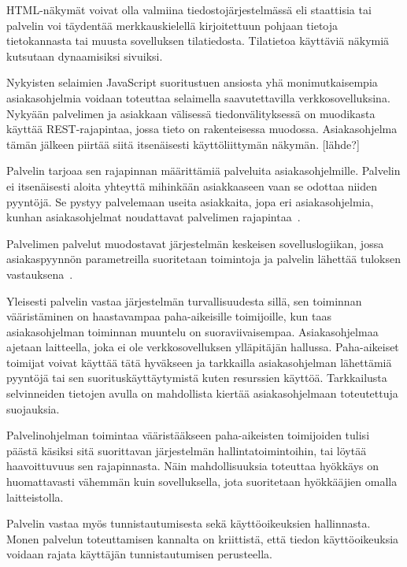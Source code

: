 \documentclass[finnish]{tktltiki2}
\theoremstyle{definition}
\theoremstyle{remark}
\begin{document}
HTML-näkymät voivat olla valmiina tiedostojärjestelmässä eli staattisia tai
palvelin voi täydentää merkkauskielellä kirjoitettuun pohjaan
tietoja tietokannasta tai muusta sovelluksen tilatiedosta. 
Tilatietoa käyttäviä näkymiä kutsutaan dynaamisiksi sivuiksi.


Nykyisten selaimien JavaScript suoritustuen ansiosta yhä
monimutkaisempia asiakasohjelmia voidaan toteuttaa
selaimella saavutettavilla verkkosovelluksina.
Nykyään palvelimen ja asiakkaan
välisessä tiedonvälityksessä on muodikasta käyttää REST-rajapintaa, jossa
tieto on rakenteisessa muodossa. Asiakasohjelma tämän jälkeen piirtää siitä
itsenäisesti käyttöliittymän näkymän. [lähde?]

Palvelin tarjoaa sen rajapinnan määrittämiä palveluita asiakasohjelmille.
Palvelin ei itsenäisesti aloita yhteyttä mihinkään
asiakkaaseen vaan se odottaa niiden pyyntöjä.
Se pystyy palvelemaan useita asiakkaita, jopa
eri asiakasohjelmia, kunhan asiakasohjelmat noudattavat
palvelimen rajapintaa~\cite{sinha_client-server_1992}.

Palvelimen palvelut muodostavat järjestelmän keskeisen
sovelluslogiikan, jossa asiakaspyynnön parametreilla
suoritetaan toimintoja ja palvelin lähettää
tuloksen vastauksena~\cite{sinha_client-server_1992}.

Yleisesti palvelin vastaa järjestelmän turvallisuudesta sillä,
sen toiminnan vääristäminen on haastavampaa paha-aikeisille
toimijoille, kun taas asiakasohjelman toiminnan muuntelu on suoraviivaisempaa.
Asiakasohjelmaa ajetaan laitteella, joka ei ole verkkosovelluksen
ylläpitäjän hallussa. Paha-aikeiset toimijat voivat käyttää tätä hyväkseen
ja tarkkailla asiakasohjelman lähettämiä pyyntöjä tai sen
suorituskäyttäytymistä kuten resurssien käyttöä.
Tarkkailusta selvinneiden tietojen avulla on mahdollista
kiertää asiakasohjelmaan toteutettuja suojauksia.

Palvelinohjelman toimintaa vääristääkseen
paha-aikeisten toimijoiden tulisi päästä
käsiksi sitä suorittavan järjestelmän hallintatoimintoihin, tai
löytää haavoittuvuus sen rajapinnasta. Näin mahdollisuuksia
toteuttaa hyökkäys on huomattavasti vähemmän kuin sovelluksella, jota
suoritetaan hyökkääjien omalla laitteistolla.

Palvelin vastaa myös tunnistautumisesta sekä käyttöoikeuksien hallinnasta.
Monen palvelun toteuttamisen kannalta on kriittistä, että
tiedon käyttöoikeuksia voidaan rajata käyttäjän tunnistautumisen perusteella.
\end{document}
